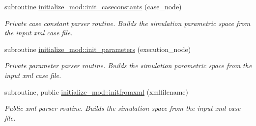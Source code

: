 \begin{DoxyCompactItemize}
subroutine \mbox{\hyperlink{namespaceinitialize__mod_a9d19665b9ac12c3db8b0842bfdb6fa0c}{initialize\+\_\+mod\+::init\+\_\+caseconstants}} (case\+\_\+node)
\begin{DoxyCompactList}\small\item\em Private case constant parser routine. Builds the simulation parametric space from the input xml case file. \end{DoxyCompactList}\item 
subroutine \mbox{\hyperlink{namespaceinitialize__mod_aac9d9dabb797c83e360f9ae60a7e65e3}{initialize\+\_\+mod\+::init\+\_\+parameters}} (execution\+\_\+node)
\begin{DoxyCompactList}\small\item\em Private parameter parser routine. Builds the simulation parametric space from the input xml case file. \end{DoxyCompactList}\item 
subroutine, public \mbox{\hyperlink{namespaceinitialize__mod_a107012ffec69fe2d7c524d240193439e}{initialize\+\_\+mod\+::initfromxml}} (xmlfilename)
\begin{DoxyCompactList}\small\item\em Public xml parser routine. Builds the simulation space from the input xml case file. \end{DoxyCompactList}\end{DoxyCompactItemize}
